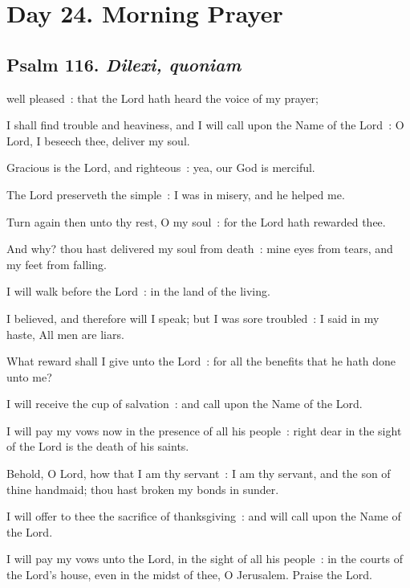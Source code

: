 \section*{Day 24. Morning Prayer}

\subsection{Psalm 116. \textit{Dilexi, quoniam}}

 well pleased~: that the Lord hath heard the voice of my prayer;\par
{}
I shall find trouble and heaviness, and I will call upon the Name of the Lord~: O Lord, I beseech thee, deliver my soul.\par
{}Gracious is the Lord, and righteous~: yea, our God is merciful.\par
{}The Lord preserveth the simple~: I was in misery, and he helped me.\par
{}Turn again then unto thy rest, O my soul~: for the Lord hath rewarded thee.\par
{}And why? thou hast delivered my soul from death~: mine eyes from tears, and my feet from falling.\par
{}I will walk before the Lord~: in the land of the living.\par
{}I believed, and therefore will I speak; but I was sore troubled~: I said in my haste, All men are liars.\par
{}What reward shall I give unto the Lord~: for all the benefits that he hath done unto me?\par
{}I will receive the cup of salvation~: and call upon the Name of the Lord.\par
{}I will pay my vows now in the presence of all his people~: right dear in the sight of the Lord is the death of his saints.\par
{}Behold, O Lord, how that I am thy servant~: I am thy servant, and the son of thine handmaid; thou hast broken my bonds in sunder.\par
{}I will offer to thee the sacrifice of thanksgiving~: and will call upon the Name of the Lord.\par
{}I will pay my vows unto the Lord, in the sight of all his people~: in the courts of the Lord's house, even in the midst of thee, O Jerusalem. Praise the Lord.\par

